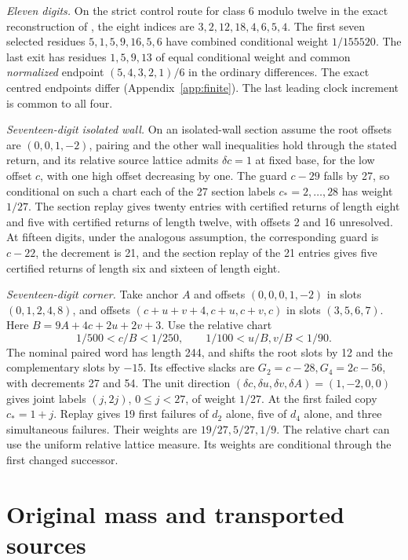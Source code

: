 \documentclass[11pt,reqno]{amsart}
\theoremstyle{definition}
\begin{document}
\textit{Eleven digits.} On the strict control route for class 6 modulo twelve in the exact reconstruction of \cite[Sections~2.2--4]{G8}, the eight indices are \(3,2,12,18,4,6,5,4\). The first seven selected residues \(5,1,5,9,16,5,6\) have combined conditional weight \(1/155520\). The last exit has residues \(1,5,9,13\) of equal conditional weight and common \emph{normalized} endpoint \((5,4,3,2,1)/6\) in the ordinary differences. The exact centred endpoints differ (Appendix~\ref{app:finite}). The last leading clock increment is common to all four.

\textit{Seventeen-digit isolated wall.} On an isolated-wall section assume the root offsets are \((0,0,1,-2)\), pairing and the other wall inequalities hold through the stated return, and its relative source lattice admits \(\delta c=1\) at fixed base, for the low offset \(c\), with one high offset decreasing by one. The guard \(c-29\) falls by 27, so conditional on such a chart each of the 27 section labels \(c_*=2,\ldots,28\) has weight \(1/27\). The section replay gives twenty entries with certified returns of length eight and five with certified returns of length twelve, with offsets 2 and 16 unresolved. At fifteen digits, under the analogous assumption, the corresponding guard is \(c-22\), the decrement is 21, and the section replay of the 21 entries gives five certified returns of length six and sixteen of length eight.

\textit{Seventeen-digit corner.} Take anchor \(A\) and offsets \((0,0,0,1,-2)\) in slots \((0,1,2,4,8)\), and offsets \((c+u+v+4,c+u,c+v,c)\) in slots \((3,5,6,7)\). Here \(B=9A+4c+2u+2v+3\). Use the relative chart
\[
 1/500<c/B<1/250,\qquad 1/100<u/B,v/B<1/90.
\]
The nominal paired word has length 244, and shifts the root slots by 12 and the complementary slots by \(-15\). Its effective slacks are \(G_2=c-28,G_4=2c-56\), with decrements 27 and 54. The unit direction \((\delta c,\delta u,\delta v,\delta A)=(1,-2,0,0)\) gives joint labels \((j,2j)\), \(0\le j<27\), of weight \(1/27\). At the first failed copy \(c_*=1+j\). Replay gives 19 first failures of \(d_2\) alone, five of \(d_4\) alone, and three simultaneous failures. Their weights are \(19/27,5/27,1/9\). The relative chart can use the uniform relative lattice measure. Its weights are conditional through the first changed successor.

\section{Original mass and transported sources}\label{sec:mass}
\end{document}
